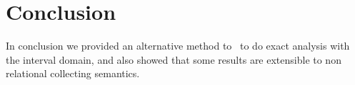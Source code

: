 \chapter{Conclusion}\label{ch:conclusion}

In conclusion we provided an alternative method to~\cite{Gawlitza2009}
to do exact analysis with the interval domain, and also showed that
some results are extensible to non relational collecting semantics.
